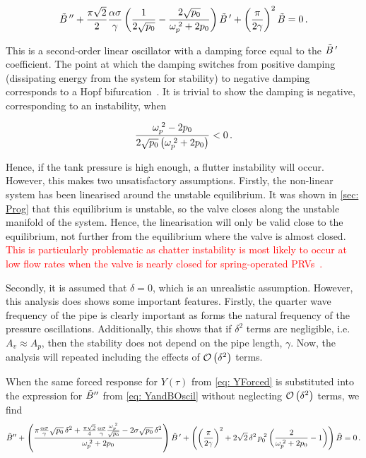 \begin{equation*}
    \tilde{B}\,{''} + \frac{\pi \sqrt{2}}{2} \frac{\alpha \sigma}{\gamma} \left( \frac{1}{2 \sqrt{p_0}} - \frac{2 \sqrt{p_0}}{\omega_p^{\;2}+2 p_0} \right) \tilde{B}\,{'} + \left( \frac{\pi}{2 \gamma} \right)^2 \tilde{B} = 0 \, .
\end{equation*}

This is a second-order linear oscillator with a damping force equal to the $\tilde{B}\,{'}$ coefficient. The point at which the damping switches from positive damping (dissipating energy from the system for stability) to negative damping corresponds to a Hopf bifurcation~\cite{Kuznetsov2004ElementsTheory}. It is trivial to show the damping is negative, corresponding to an instability, when

\begin{equation*}
    \frac{\omega_p^{\;2} - 2 p_0}{2 \sqrt{p_0} \left( \omega_p^{\;2} + 2 p_0 \right)} < 0 \, .
\end{equation*}

Hence, if the tank pressure is high enough, a flutter instability will occur.
However, this makes two unsatisfactory assumptions. Firstly, the non-linear system has been linearised around the unstable equilibrium. It was shown in \cref{sec: Prog} that this equilibrium is unstable, so the valve closes along the unstable manifold of the system. Hence, the linearisation will only be valid close to the equilibrium, not further from the equilibrium where the valve is almost closed. \textcolor{Red}{This is particularly problematic as chatter instability is most likely to occur at low flow rates when the valve is nearly closed for spring-operated PRVs~\cite{Hos2016DynamicService}.}

Secondly, it is assumed that $\delta = 0$, which is an unrealistic assumption. However, this analysis does shows some important features. Firstly, the quarter wave frequency of the pipe is clearly important as forms the natural frequency of the pressure oscillations. Additionally, this shows that if $\delta^2$ terms are negligible, i.e. $A_v \approx A_p$, then the stability does not depend on the pipe length, $\gamma$. Now, the analysis will repeated including the effects of $\mathcal{O}\left( \delta^2 \right)$ terms.

When the same forced response for $Y(\tau)$ from \cref{eq: YForced} is substituted into the expression for $\tilde{B}{''}$ from \cref{eq: YandBOscil} without neglecting $\mathcal{O}\left( \delta^2 \right)$ terms, we find
~
\begin{equation*}
    \tilde{B}{''} +
    \left( \frac{
    \pi \frac{\alpha \sigma}{\gamma} \sqrt{p_0} \, \delta^2 + \frac{\pi \sqrt{2}}{4} \frac{\alpha \sigma}{\gamma} \frac{\omega_p^{\;2}}{\sqrt{p_0}} - 2 \sigma \sqrt{p_0} \, \delta^2
    }{\omega_p^{\;2} + 2 p_0} \right) \tilde{B}\,{'} +
    \left( \left( \frac{\pi}{2 \gamma} \right)^2 + 2 \sqrt{2} \, \delta^2 \, p_0^{\;2} \left( \frac{2}{\omega_p^{\;2} + 2 p_0} - 1 \right) \right) \tilde{B} = 0 \, .
\end{equation*}

